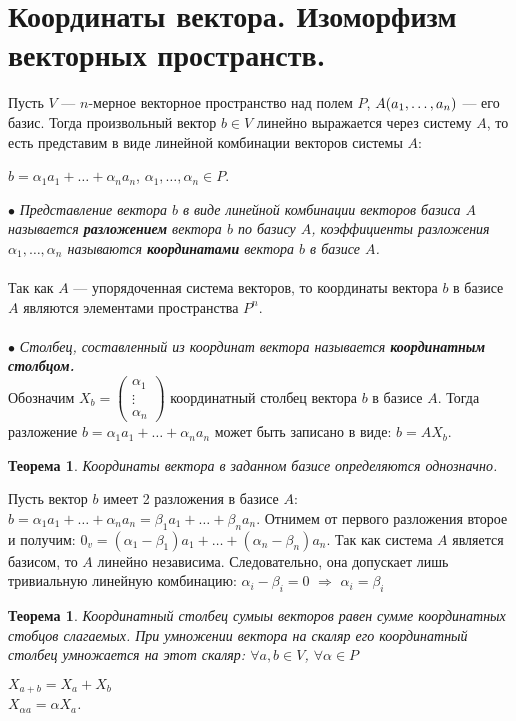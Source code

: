 \section{Координаты вектора. Изоморфизм векторных пространств.}
Пусть $V$ --- $n$-мерное векторное пространство над полем $P$, $A(a_1,\dots,a_n)$ --- его базис. Тогда произвольный вектор $b\in V$ линейно выражается через систему $A$, то есть представим в виде линейной комбинации векторов системы $A$:\begin{center}
	$b = \alpha_1a_1 + \ldots + \alpha_na_n$, $\alpha_1,\dots,\alpha_n \in P.$
\end{center}
$\bullet$ \textit{Представление вектора $b$ в виде линейной комбинации векторов базиса $A$ называется \textbf{разложением} вектора $b$ по базису $A$, коэффициенты разложения $\alpha_1,\dots,\alpha_n$ называются \textbf{координатами} вектора $b$ в базисе $A$.}\\\\
Так как $A$ --- упорядоченная система векторов, то координаты вектора $b$ в базисе $A$ являются элементами пространства $P^n$.\\\\
$\bullet$ \textit{Столбец, составленный из координат вектора называется \textbf{координатным столбцом.}}\\
Обозначим $X_b = \begin{pmatrix}
	\alpha_1\\ \vdots \\ \alpha_n
\end{pmatrix}$ координатный столбец вектора $b$ в базисе $A$. Тогда разложение $b = \alpha_1a_1 + \ldots + \alpha_na_n$ может быть записано в виде: $b = AX_b$.
\newtheorem*{th4_1}{Теорема}\begin{th4_1} Координаты вектора в заданном базисе определяются однозначно.
\end{th4_1}
\begin{Proof}
	Пусть вектор $b$ имеет 2 разложения в базисе $A$: $b = \alpha_1a_1 + \ldots + \alpha_na_n = \beta_1a_1 + \ldots + \beta_na_n$. Отнимем от первого разложения второе и получим: 
	$0_v = (\alpha_1 - \beta_1)a_1 + \ldots + (\alpha_n - \beta_n)a_n$. Так как система $A$ является базисом, то $A$ линейно независима. Следовательно, она допускает лишь тривиальную линейную комбинацию: $\alpha_i - \beta_i = 0$ $\Rightarrow$ $\alpha_i = \beta_i$
\end{Proof}
\newtheorem*{th4_2}{Теорема}\begin{th4_2} Координатный столбец сумыы векторов равен сумме координатных стобцов слагаемых. При умножении вектора на скаляр его координатный столбец умножается на этот скаляр: $\forall a, b \in V$, $\forall \alpha \in P$\begin{center}
		$X_{a+b} = X_a + X_b$\\
		$X_{\alpha a} = \alpha X_a$.
	\end{center}
\end{th4_2}
